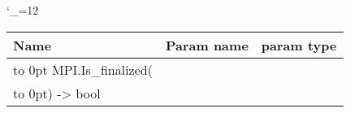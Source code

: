 \begingroup \catcode`\_=12 \tt
\begin{tabular}{lll}
\toprule
\textrm{Name}&\textrm{Param name}&\textrm{param type}\\
\midrule
\hbox to 0pt {MPI.Is_finalized(\hss}\\
\hbox to 0pt{) -> bool\hss}\\
\bottomrule
\end{tabular}
\endgroup
